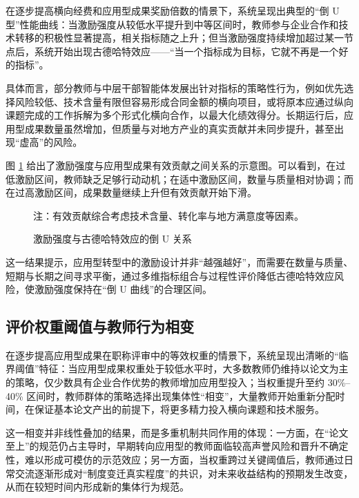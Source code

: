 \documentclass[UTF8, zihao=-4, fontset=mac]{ctexart}
\begin{document}
在逐步提高横向经费和应用型成果奖励倍数的情景下，系统呈现出典型的“倒 U 型”性能曲线：当激励强度从较低水平提升到中等区间时，教师参与企业合作和技术转移的积极性显著提高，相关指标随之上升；但当激励强度持续增加超过某一节点后，系统开始出现古德哈特效应——“当一个指标成为目标，它就不再是一个好的指标”。

具体而言，部分教师与中层干部智能体发展出针对指标的策略性行为，例如优先选择风险较低、技术含量有限但容易形成合同金额的横向项目，或将原本应通过纵向课题完成的工作拆解为多个形式化横向合作，以最大化绩效得分。长期运行后，应用型成果数量虽然增加，但质量与对地方产业的真实贡献并未同步提升，甚至出现“虚高”的风险。

图 \ref{fig:goodhart} 给出了激励强度与应用型成果有效贡献之间关系的示意图。可以看到，在过低激励区间，教师缺乏足够行动动机；在适中激励区间，数量与质量相对协调；而在过高激励区间，成果数量继续上升但有效贡献开始下滑。

\begin{figure}[htbp]
    \centering
    \caption{激励强度与古德哈特效应的倒 U 关系}
    \label{fig:goodhart}
    \vspace{-0.5em}
    {\footnotesize \kaishu 注：有效贡献综合考虑技术含量、转化率与地方满意度等因素。}
\end{figure}

这一结果提示，应用型转型中的激励设计并非“越强越好”，而需要在数量与质量、短期与长期之间寻求平衡，通过多维指标组合与过程性评价降低古德哈特效应风险，使激励强度保持在“倒 U 曲线”的合理区间。

\subsection{评价权重阈值与教师行为相变}

在逐步提高应用型成果在职称评审中的等效权重的情景下，系统呈现出清晰的“临界阈值”特征：当应用型成果权重处于较低水平时，大多数教师仍维持以论文为主的策略，仅少数具有企业合作优势的教师增加应用型投入；当权重提升至约 30\%--40\% 区间时，教师群体的策略选择出现集体性“相变”，大量教师开始重新分配时间，在保证基本论文产出的前提下，将更多精力投入横向课题和技术服务。

这一相变并非线性叠加的结果，而是多重机制共同作用的体现：一方面，在“论文至上”的规范仍占主导时，早期转向应用型的教师面临较高声誉风险和晋升不确定性，难以形成可模仿的示范效应；另一方面，当权重跨过关键阈值后，教师通过日常交流逐渐形成对“制度变迁真实程度”的共识，对未来收益结构的预期发生改变，从而在较短时间内形成新的集体行为规范。
\end{document}
